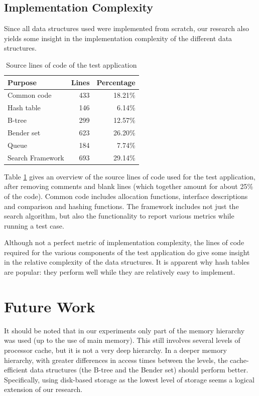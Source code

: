 \documentclass{acm_proc_article-sp}
\begin{document}
\subsection{Implementation Complexity}
Since all data structures used were implemented from scratch, our research
also yields some insight in the implementation complexity of the different
data structures.

\begin{table}
\begin{center}
\begin{tabular}{ l r r }
\hline
\textbf{Purpose} & \textbf{Lines} & \textbf{Percentage} \\
\hline
Common code       & 433 & 18.21\% \\
Hash table        & 146 &  6.14\% \\
B-tree            & 299 & 12.57\% \\
Bender set        & 623 & 26.20\% \\
Queue             & 184 &  7.74\% \\
Search Framework  & 693 & 29.14\% \\
\hline
\end{tabular}
\caption{Source lines of code of the test application}
\label{tab-loc}
\end{center}
\end{table}

Table \ref {tab-loc} gives an overview of the source lines of code used for
the test application, after removing comments and blank lines (which together
amount for about 25\% of the code). Common code includes allocation functions,
interface descriptions and comparison and hashing functions. The framework
includes not just the search algorithm, but also the functionality to report
various metrics while running a test case.

Although not a perfect metric of implementation complexity, the lines of code
required for the various components of the test application do give some
insight in the relative complexity of the data structures. It is apparent why
hash tables are popular: they perform well while they are relatively easy to
implement.

\section{Future Work}
It should be noted that in our experiments only part of the memory
hierarchy was used (up to the use of main memory). This still involves several
levels of processor cache, but it is not a very deep hierarchy. In a deeper
memory hierarchy, with greater differences in access times between the levels,
the cache-efficient data structures (the B-tree and the Bender set) should
perform better. Specifically, using disk-based storage as the lowest level of
storage seems a logical extension of our research.
\end{document}
